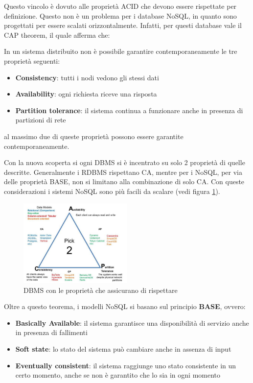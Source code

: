       Questo vincolo è dovuto alle proprietà ACID che devono essere rispettate per
      definizione. Questo non è un problema per i database NoSQL, in quanto sono
      progettati per essere scalati orizzontalmente. Infatti, per questi database vale
      il CAP theorem, il quale afferma che:
      \begin{teorema}
            In un sistema distribuito non è possibile garantire contemporaneamente
            le tre proprietà seguenti:
            \begin{itemize}
                  \item \textbf{Consistency}: tutti i nodi vedono gli stessi dati
                  \item \textbf{Availability}: ogni richiesta riceve una risposta
                  \item \textbf{Partition tolerance}: il sistema continua a funzionare
                        anche in presenza di partizioni di rete
            \end{itemize}
            al massimo due di queste proprietà possono essere garantite contemporaneamente.
      \end{teorema}
      Con la nuova scoperta si ogni DBMS si è incentrato su solo 2 proprietà di quelle
      descritte. Generalmente i RDBMS rispettano CA, mentre per i NoSQL, per via delle
      proprietà BASE, non si limitano alla combinazione di solo CA. Con queste considerazioni
      i sistemi NoSQL sono più facili da scalare (vedi figura \ref{fig:cap}).
      \begin{figure} [!ht]
            \centering
            \includegraphics[width=0.5\textwidth]{img/nosql/CAP.png}
            \caption{DBMS con le proprietà che assicurano di rispettare}
            \label{fig:cap}
      \end{figure}
      Oltre a questo teorema, i modelli NoSQL si basano sul principio \textbf{BASE},
      ovvero:
      \begin{itemize}
            \item \textbf{Basically Available}: il sistema garantisce una disponibilità
                  di servizio anche in presenza di fallimenti
            \item \textbf{Soft state}: lo stato del sistema può cambiare anche in assenza
                  di input
            \item \textbf{Eventually consistent}: il sistema raggiunge uno stato consistente
                  in un certo momento, anche se non è garantito che lo sia in ogni momento
      \end{itemize}
